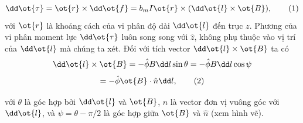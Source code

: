 \begin{loigiai}
        \[ \dd \ot{\tau}= \ot{r} \times \dd \ot{f} = b_m I \ot{r} \times (\dd \ot{l} \times \ot{B}),  \tag{1}\label{n.1}\]
với $\ot{r}$ là khoảng cách của vi phân độ dài $\dd\ot{l}$ đến trục $z$. Phương của vi phân moment lực $\dd \ot{\tau}$ luôn song song với ${\hat{z}}$, không phụ thuộc vào vị trí của $\dd\ot{l}$ mà chúng ta xét. Đối với tích vector $\dd\ot{l} \times\ot{B}$ ta có
      \[\dd\ot{l}\times \ot{B}=-\hat{{\phi}}B \dd l \sin\theta = - \hat{{\phi}} B \dd l \cos \psi\]
            \[=-\hat{{\phi}}\ot{B} \cdot \hat{n} \dd l, \tag{2}\]

với $\theta$ là góc hợp bởi $\dd \ot{l}$ và $\ot{B}$, ${\hat{n}}$ là vector đơn vị vuông góc với $\dd\ot{l}$, và $\psi = \theta - \pi/2$ là góc hợp giữa $\ot{B}$ và ${\hat{n}}$ (xem hình vẽ). 
  \begin{center}



\begin{tikzpicture}[x=0.75pt,y=0.75pt,yscale=-1,xscale=1]


\end{tikzpicture}
\end{center}
\end{loigiai}
